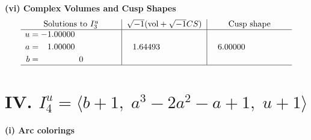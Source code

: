 \documentclass[1p]{elsarticle_modified}
\theoremstyle{definition}
\newcommand{\I}{\sqrt{-1}}
\begin{document}
\newpage\flushleft \textbf{(vi) Complex Volumes and Cusp Shapes}
$$\begin{array}{c|c|c}  
\text{Solutions to }I^u_{3}& \I (\text{vol} + \sqrt{-1}CS) & \text{Cusp shape}\\
 \hline 
\begin{aligned}
u &= -1.00000\phantom{ +0.000000I} \\
a &= \phantom{-}1.00000\phantom{ +0.000000I} \\
b &= \phantom{-0.000000 } 0\end{aligned}
 & \phantom{-}1.64493\phantom{ +0.000000I} & \phantom{-}6.00000\phantom{ +0.000000I}\\
 \hline 
 \end{array}$$\newpage\newpage\renewcommand{\arraystretch}{1}
\centering \section*{IV. $I^u_{4}= \langle b+1,\;a^3-2 a^2- a+1,\;u+1 \rangle$}
\flushleft \textbf{(i) Arc colorings}\\
\end{document}
